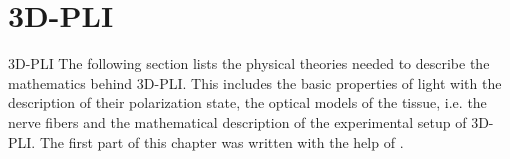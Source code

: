\setcounter{chapter}{2}
\chapter{3D-PLI}
\label{sec:theory}
%
%
3D-PLI
The following section lists the physical theories needed to describe the mathematics behind \ac{3D-PLI}. This includes the basic properties of light with the description of their polarization state, the optical models of the tissue, i.e. the nerve fibers and the mathematical description of the experimental setup of \ac{3D-PLI}. The first part of this chapter was written with the help of \cite{demtroeder2, Fliebach2012}.
% 
% 
% 
